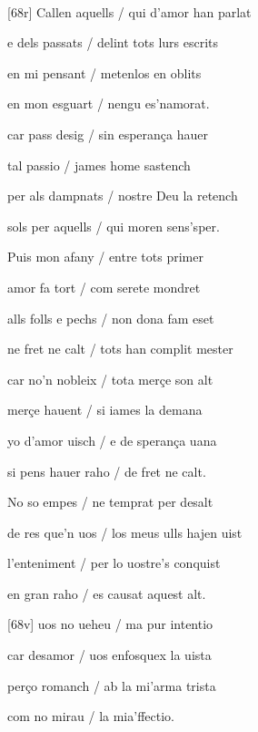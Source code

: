 \documentclass[12pt]{article}
\renewcommand{\espaiAbansEtiquetaPoema}{\vspace{0ex}}
\begin{document}
\begin{estrofa}

\espaiAbansEtiquetaPoema

\\

\end{estrofa}


\begin{estrofa}

 [68r] Callen aquells / qui d'amor han parlat

 e dels passats / delint tots lurs escrits

 en mi pensant / metenlos en oblits

 en mon esguart / nengu es'namorat.

 car pass desig / sin esperan\c{c}a hauer

 tal passio / james home sastench

 per als dampnats / nostre Deu la retench

 sols per aquells / qui moren sens'sper.

\end{estrofa}



\begin{estrofa}

 Puis mon afany / entre tots primer

 amor fa tort / com serete mondret

 alls folls e pechs / non dona fam eset

 ne fret ne calt / tots han complit mester

 car no'n nobleix / tota mer\c{c}e son alt

 mer\c{c}e hauent / si iames la demana

 yo d'amor uisch / e de speran\c{c}a uana

 si pens hauer raho / de fret ne calt.

\end{estrofa}



\begin{estrofa}

 No so empes / ne temprat per desalt

 de res que'n uos / los meus ulls hajen uist

 l'enteniment / per lo uostre's conquist

 en gran raho / es causat aquest alt.

 [68v] uos no ueheu / ma pur intentio

 car desamor / uos enfosquex la uista

 per\c{c}o romanch / ab la mi'arma trista

 com no mirau / la mia'ffectio.

\end{estrofa}
\end{document}
